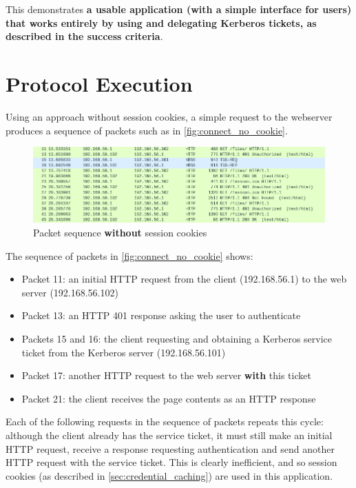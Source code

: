 \documentclass[12pt]{report}
\begin{document}
This demonstrates \textbf{a usable application (with a simple interface for users) that works entirely by using and delegating Kerberos tickets, as described in the success criteria}.

\section{Protocol Execution}
\label{sec:protocol_execution}
Using an approach without session cookies, a simple request to the webserver produces a sequence of packets such as in \autoref{fig:connect_no_cookie}.

\begin{figure}[ht]
  \begin{center}
    \includegraphics[width=\textwidth]{09-connect-no-cookie.png}
  \end{center}
  \caption{Packet sequence \textbf{without} session cookies}
  \label{fig:connect_no_cookie}
\end{figure}

The sequence of packets in \autoref{fig:connect_no_cookie} shows:

\begin{itemize}
\item
  Packet 11: an initial HTTP request from the client (192.168.56.1) to the web server (192.168.56.102)
\item
  Packet 13: an HTTP 401 response asking the user to authenticate
\item
  Packets 15 and 16: the client requesting and obtaining a Kerberos service ticket from the Kerberos server (192.168.56.101)
\item
  Packet 17: another HTTP request to the web server \textbf{with} this ticket
\item
  Packet 21: the client receives the page contents as an HTTP response
\end{itemize}

Each of the following requests in the sequence of packets repeats this cycle: although the client already has the service ticket, it must still make an initial HTTP request, receive a response requesting authentication and send another HTTP request with the service ticket. This is clearly inefficient, and so session cookies (as described in \autoref{sec:credential_caching}) are used in this application.
\end{document}

